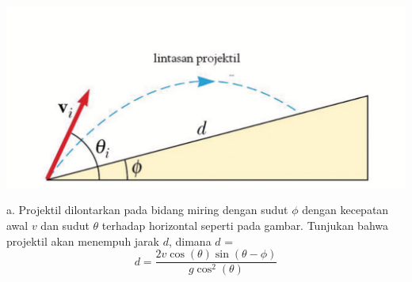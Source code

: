 \item
\mbox{}
\begin{center}
\includegraphics [scale=0.3]{./latex/eps/1_4_1_image_1-eps-converted-to.pdf}
\end{center}a. Projektil dilontarkan pada bidang miring dengan sudut $\phi$ dengan kecepatan awal $v$ dan sudut $\theta$ terhadap horizontal seperti pada gambar. Tunjukan bahwa projektil akan menempuh jarak $d$, dimana $d$ =
\begin{equation*}
        d= \frac{2 v \cos \left(\theta\right) \sin\left(\theta-\phi\right)}{g \cos^2\left(\theta\right)}
\end{equation*}

